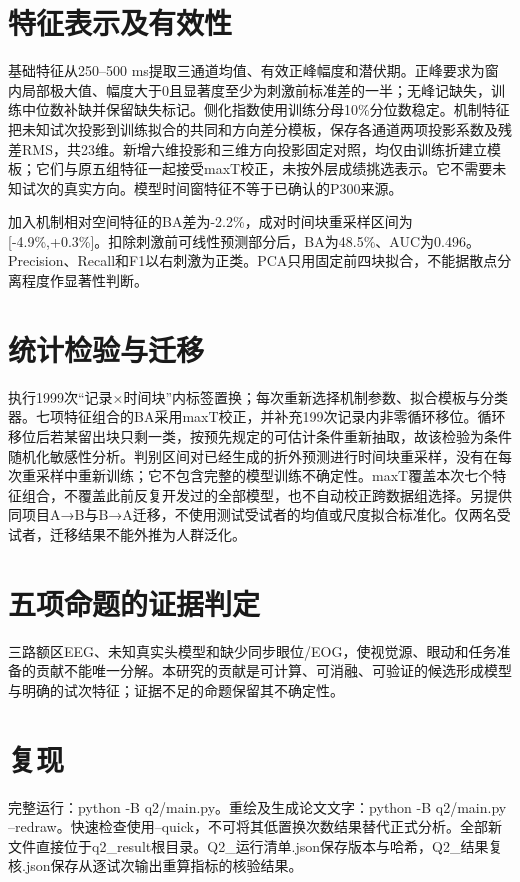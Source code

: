 \documentclass[UTF8,a4paper,11pt]{ctexart}
\begin{document}
\section{特征表示及有效性}

基础特征从250–500 ms提取三通道均值、有效正峰幅度和潜伏期。正峰要求为窗内局部极大值、幅度大于0且显著度至少为刺激前标准差的一半；无峰记缺失，训练中位数补缺并保留缺失标记。侧化指数使用训练分母10\%分位数稳定。机制特征把未知试次投影到训练拟合的共同和方向差分模板，保存各通道两项投影系数及残差RMS，共23维。新增六维投影和三维方向投影固定对照，均仅由训练折建立模板；它们与原五组特征一起接受maxT校正，未按外层成绩挑选表示。它不需要未知试次的真实方向。模型时间窗特征不等于已确认的P300来源。


加入机制相对空间特征的BA差为-2.2\%，成对时间块重采样区间为[-4.9\%,+0.3\%]。扣除刺激前可线性预测部分后，BA为48.5\%、AUC为0.496。Precision、Recall和F1以右刺激为正类。PCA只用固定前四块拟合，不能据散点分离程度作显著性判断。

\section{统计检验与迁移}

执行1999次“记录×时间块”内标签置换；每次重新选择机制参数、拟合模板与分类器。七项特征组合的BA采用maxT校正，并补充199次记录内非零循环移位。循环移位后若某留出块只剩一类，按预先规定的可估计条件重新抽取，故该检验为条件随机化敏感性分析。判别区间对已经生成的折外预测进行时间块重采样，没有在每次重采样中重新训练；它不包含完整的模型训练不确定性。maxT覆盖本次七个特征组合，不覆盖此前反复开发过的全部模型，也不自动校正跨数据组选择。另提供同项目A→B与B→A迁移，不使用测试受试者的均值或尺度拟合标准化。仅两名受试者，迁移结果不能外推为人群泛化。


\section{五项命题的证据判定}


三路额区EEG、未知真实头模型和缺少同步眼位/EOG，使视觉源、眼动和任务准备的贡献不能唯一分解。本研究的贡献是可计算、可消融、可验证的候选形成模型与明确的试次特征；证据不足的命题保留其不确定性。

\section{复现}

完整运行：python -B q2/main.py。重绘及生成论文文字：python -B q2/main.py --redraw。快速检查使用--quick，不可将其低置换次数结果替代正式分析。全部新文件直接位于q2\_result根目录。Q2\_运行清单.json保存版本与哈希，Q2\_结果复核.json保存从逐试次输出重算指标的核验结果。
\end{document}
